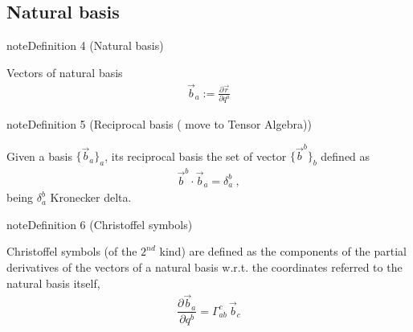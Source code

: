 \documentclass[letterpaper,10pt,english]{jupyterBook}
\begin{document}
\subsection{Natural basis}
\label{\detokenize{ch/tensor-algebra-calculus/calculus-euclidean:natural-basis}}\label{\detokenize{ch/tensor-algebra-calculus/calculus-euclidean:tensor-calculus-coordinates-natural-basis}}\label{ch/tensor-algebra-calculus/calculus-euclidean:definition-1}
\begin{sphinxadmonition}{note}{Definition 4 (Natural basis)}



\sphinxAtStartPar
Vectors of natural basis
\begin{equation*}
\begin{split}\vec{b}_a := \frac{\partial \vec{r}}{\partial q^a}\end{split}
\end{equation*}\end{sphinxadmonition}
\label{ch/tensor-algebra-calculus/calculus-euclidean:definition-2}
\begin{sphinxadmonition}{note}{Definition 5 (Reciprocal basis ( move to Tensor Algebra))}



\sphinxAtStartPar
Given a basis \(\{ \vec{b}_a \}_{a}\), its reciprocal basis the set of vector \(\{ \vec{b}^b \}_b\) defined as
\begin{equation*}
\begin{split}\vec{b}^b \cdot \vec{b}_a = \delta_{a}^b \ ,\end{split}
\end{equation*}
\sphinxAtStartPar
being \(\delta_a^b\) Kronecker delta.
\end{sphinxadmonition}
\label{ch/tensor-algebra-calculus/calculus-euclidean:definition-3}
\begin{sphinxadmonition}{note}{Definition 6 (Christoffel symbols)}



\sphinxAtStartPar
Christoffel symbols (of the \(2^{nd}\) kind) are defined as the components of the partial derivatives of the vectors of a natural basis w.r.t. the coordinates referred to the natural basis itself,
\begin{equation}\label{equation:ch/tensor-algebra-calculus/calculus-euclidean:def:christoffel:2}
\begin{split}\dfrac{\partial \vec{b}_a}{\partial q^b} = \Gamma_{ab}^c \, \vec{b}_c\end{split}
\end{equation}\end{sphinxadmonition}
\end{document}
